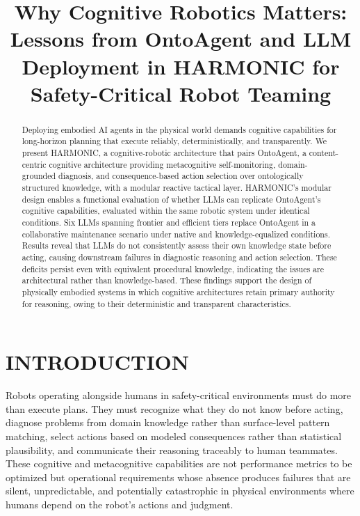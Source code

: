 \documentclass[letterpaper, 10 pt, conference]{ieeeconf}  %
\title{\LARGE \bf
Why Cognitive Robotics Matters: Lessons from OntoAgent and LLM Deployment in HARMONIC for Safety-Critical Robot Teaming
}
\begin{document}
\maketitle
\thispagestyle{empty}
\pagestyle{empty}


\begin{abstract}

Deploying embodied AI agents in the physical world demands cognitive capabilities for long-horizon planning that execute reliably, deterministically, and transparently. We present HARMONIC, a cognitive-robotic architecture that pairs OntoAgent, a content-centric cognitive architecture providing metacognitive self-monitoring, domain-grounded diagnosis, and consequence-based action selection over ontologically structured knowledge, with a modular reactive tactical layer. HARMONIC's modular design enables a functional evaluation of whether LLMs can replicate OntoAgent's cognitive capabilities, evaluated within the same robotic system under identical conditions. Six LLMs spanning frontier and efficient tiers replace OntoAgent in a collaborative maintenance scenario under native and knowledge-equalized conditions. Results reveal that LLMs do not consistently assess their own knowledge state before acting, causing downstream failures in diagnostic reasoning and action selection. These deficits persist even with equivalent procedural knowledge, indicating the issues are architectural rather than knowledge-based. These findings support the design of physically embodied systems in which cognitive architectures retain primary authority for reasoning, owing to their deterministic and transparent characteristics.

\end{abstract}


\section{INTRODUCTION}

Robots operating alongside humans in safety-critical environments must do more than execute plans. They must recognize what they do not know before acting, diagnose problems from domain knowledge rather than surface-level pattern matching, select actions based on modeled consequences rather than statistical plausibility, and communicate their reasoning traceably to human teammates. These cognitive and metacognitive capabilities are not performance metrics to be optimized but operational requirements whose absence produces failures that are silent, unpredictable, and potentially catastrophic in physical environments where humans depend on the robot's actions and judgment.
\end{document}
